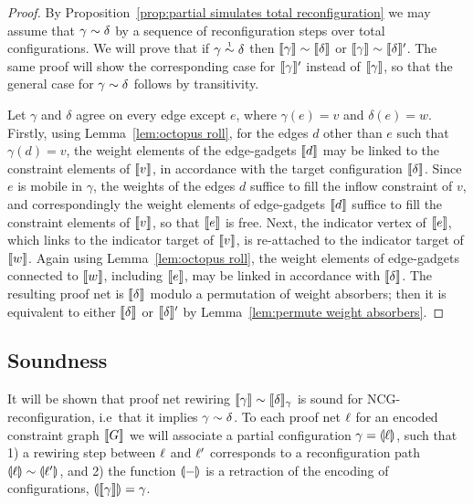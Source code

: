 \documentclass{lmcs}
\let\capsabbrev=\uppercase
\begin{document}
\begin{proof}
By Proposition~\ref{prop:partial simulates total reconfiguration} we may assume that $\gamma\perm\delta$ by a sequence of reconfiguration steps over total configurations.
%
We will prove that if $\gamma\perm*\delta$ then $\itn\gamma\perm\itn\delta$ or $\itn\gamma\perm\itn\delta'$.
%
The same proof will show the corresponding case for $\llbracket\gamma\rrbracket'$ instead of $\llbracket\gamma\rrbracket$, so that the general case for $\gamma\perm\delta$ follows by transitivity.



Let $\gamma$ and $\delta$ agree on every edge except $e$, where $\gamma(e)=v$ and $\delta(e)=w$.
%
Firstly, using Lemma~\ref{lem:octopus roll}, for the edges $d$ other than $e$ such that $\gamma(d)=v$, the weight elements of the edge-gadgets $\llbracket d\rrbracket$ may be linked to the constraint elements of $\llbracket v\rrbracket$, in accordance with the target configuration $\llbracket\delta\rrbracket$.
%
Since $e$ is mobile in $\gamma$, the weights of the edges $d$ suffice to fill the inflow constraint of $v$, and correspondingly the weight elements of edge-gadgets $\llbracket d\rrbracket$ suffice to fill the constraint elements of $\llbracket v\rrbracket$, so that $\llbracket e\rrbracket$ is free.
%
Next, the indicator vertex of $\llbracket e\rrbracket$, which links to the indicator target of $\llbracket v\rrbracket$, is re-attached to the indicator target of $\llbracket w\rrbracket$.
%
Again using Lemma~\ref{lem:octopus roll}, the weight elements of edge-gadgets connected to $\llbracket w\rrbracket$, including $\llbracket e\rrbracket$, may be linked in accordance with $\llbracket\delta\rrbracket$.
%
The resulting proof net is $\llbracket\delta\rrbracket$ modulo a permutation of weight absorbers; then it is equivalent to either $\llbracket\delta\rrbracket$ or $\llbracket\delta\rrbracket'$ by Lemma~\ref{lem:permute weight absorbers}.
\end{proof}



\subsection*{Soundness}


It will be shown that proof net rewiring $\itn\gamma\perm\itn\delta_\gamma$ is sound for \capsabbrev{ncg}-reconfiguration, i.e\ that it implies $\gamma\perm\delta$.
%
To each proof net $\ell$ for an encoded constraint graph $\llbracket G\rrbracket$ we will associate a partial configuration $\gamma=\llparenthesis\ell\rrparenthesis$, such that 1) a rewiring step between $\ell$ and $\ell'$ corresponds to a reconfiguration path $\coitn\links\perm\coitn{\links'}$, and 2) the function $\llparenthesis-\rrparenthesis$ is a retraction of the encoding of configurations, $\llparenthesis\llbracket\gamma\rrbracket\rrparenthesis=\gamma$.
\end{document}
